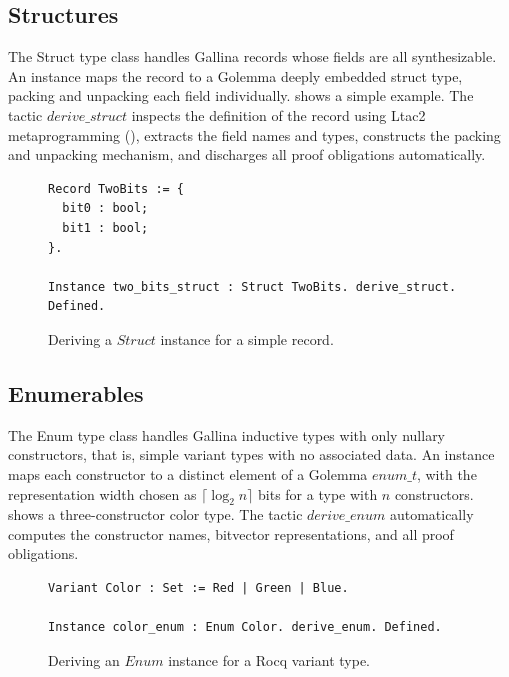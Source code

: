 \documentclass[fontset=fira-newtxsf]{mitthesis}
\theoremstyle{definition}
\theoremstyle{plain}
\begin{document}
\subsection{Structures} \label{sec:Golemma-struct}
The Struct type class handles Gallina records whose fields are all synthesizable.
An instance maps the record to a Golemma deeply embedded struct type, packing and unpacking each field individually.
 shows a simple example.
The tactic $\mathit{derive\_struct}$ inspects the definition of the record using Ltac2 metaprogramming (), extracts the field names and types, constructs the packing and unpacking mechanism, and discharges all proof obligations automatically.

\begin{figure}[H]
\begin{verbatim}
Record TwoBits := {
  bit0 : bool;
  bit1 : bool;
}.

Instance two_bits_struct : Struct TwoBits. derive_struct. Defined.
\end{verbatim}
\caption[Struct example]{Deriving a $\mathit{Struct}$ instance for a simple record.}
\label{fig:synth-struct}
\end{figure}

\subsection{Enumerables} \label{sec:Golemma-enum}
The Enum type class handles Gallina inductive types with only nullary constructors, that is, simple variant types with no associated data.
An instance maps each constructor to a distinct element of a Golemma $\mathit{enum\_t}$, with the representation width chosen as $\lceil \log_2 n \rceil$ bits for a type with $n$ constructors.
 shows a three-constructor color type.
The tactic $\mathit{derive\_enum}$ automatically computes the constructor names, bitvector representations, and all proof obligations.

\begin{figure}[H]
\begin{verbatim}
Variant Color : Set := Red | Green | Blue.

Instance color_enum : Enum Color. derive_enum. Defined.
\end{verbatim}
\caption[Enum example]{Deriving an $\mathit{Enum}$ instance for a Rocq variant type.}
\label{fig:synth-enum}
\end{figure}
\end{document}

